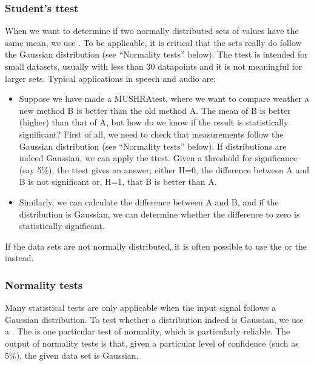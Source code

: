 \documentclass[letterpaper,10pt,english]{jupyterBook}
\begin{document}
\subsubsection{Student’s t\sphinxhyphen{}test}
\label{\detokenize{Evaluation/Analysis_of_evaluation_results:student-s-t-test}}
\sphinxAtStartPar
When we want to determine if two normally distributed sets of values
have the same mean, we use . To be
applicable, it is critical that the sets really do follow the Gaussian
distribution (see “Normality tests” below). The t\sphinxhyphen{}test is intended for
small data\sphinxhyphen{}sets, usually with less than 30 data\sphinxhyphen{}points and it is not
meaningful for larger sets. Typical applications in speech and audio
are:
\begin{itemize}
\item {} 
\sphinxAtStartPar
Suppose we have made a MUSHRA\sphinxhyphen{}test, where we want to compare weather
a new method B is better than the old method A. The mean of B is
better (higher) than that of A, but how do we know if the result is
statistically significant? First of all, we need to check that
measurements follow the Gaussian distribution (see “Normality tests”
below). If distributions are indeed Gaussian, we can apply the
t\sphinxhyphen{}test. Given a threshold for significance (say 5\%), the t\sphinxhyphen{}test
gives an answer; either H=0, the difference between A and B is not
significant or, H=1, that B is better than A.

\item {} 
\sphinxAtStartPar
Similarly, we can calculate the difference between A and B, and if
the distribution is Gaussian, we can determine whether the
difference to zero is statistically significant.

\end{itemize}

\sphinxAtStartPar
If the data sets are not normally distributed, it is often possible to
use the  or the
 instead.


\subsubsection{Normality tests}
\label{\detokenize{Evaluation/Analysis_of_evaluation_results:normality-tests}}
\sphinxAtStartPar
Many statistical tests are only applicable when the input signal follows
a Gaussian distribution. To test whether a distribution indeed is
Gaussian, we use a . The  is one
particular test of normality, which is particularly reliable. The output
of normality tests is that, given a particular level of confidence (such
as 5\%), the given data set is Gaussian.
\end{document}
